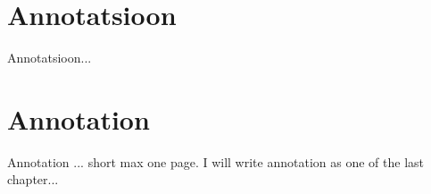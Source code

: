 \clearpage
\chapter*{Annotatsioon}
\label{annotatsioon}
\thispagestyle{empty}
Annotatsioon...


\clearpage
\chapter*{Annotation}
\label{annotation}
\thispagestyle{empty}


Annotation ... short max one page. I will write annotation as one of the last chapter...
